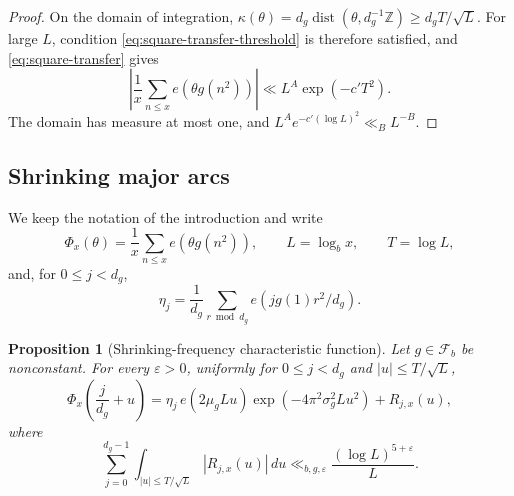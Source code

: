 \documentclass[11pt,reqno]{amsart}
\theoremstyle{plain}
\newtheorem{proposition}[theorem]{Proposition}
\theoremstyle{definition}
\newcommand{\Z}{\mathbb{Z}}
\newcommand{\eps}{\varepsilon}
\newcommand{\ee}[1]{e\!\left(#1\right)}
\newcommand{\1}{\mathbf 1}
\DeclareMathOperator{\dist}{dist}
\begin{document}
\begin{proof}
On the domain of integration,
$\kappa(\theta)=d_g\dist(\theta,d_g^{-1}\Z)\ge d_gT/\sqrt L$.
For large $L$, condition \eqref{eq:square-transfer-threshold} is therefore satisfied, and \eqref{eq:square-transfer} gives
\[
 \left|\frac1x\sum_{n\le x}\ee{\theta g(n^2)}\right|
 \ll L^A\exp(-c'T^2).
\]
The domain has measure at most one, and $L^Ae^{-c'(\log L)^2}\ll_B L^{-B}$.
\end{proof}

\subsection{Shrinking major arcs}

We keep the notation of the introduction and write
\begin{equation}\label{eq:square-Phi}
 \Phi_x(\theta)=\frac1x\sum_{n\le x}\ee{\theta g(n^2)},
 \qquad L=\log_bx,\qquad T=\log L,
\end{equation}
and, for $0\le j<d_g$,
\begin{equation}\label{eq:square-eta}
 \eta_j=\frac1{d_g}\sum_{r\bmod d_g}
 \ee{jg(1)r^2/d_g}.
\end{equation}

\begin{proposition}[Shrinking-frequency characteristic function]\label{prop:square-major}
Let $g\in\mathcal F_b$ be nonconstant.  For every $\eps>0$, uniformly for $0\le j<d_g$ and $|u|\le T/\sqrt L$,
\begin{equation}\label{eq:square-major-point}
 \Phi_x\left(\frac j{d_g}+u\right)
 =\eta_j\,\ee{2\mu_gLu}
 \exp(-4\pi^2\sigma_g^2Lu^2)+R_{j,x}(u),
\end{equation}
where
\begin{equation}\label{eq:square-major-L1}
 \sum_{j=0}^{d_g-1}\int_{|u|\le T/\sqrt L}|R_{j,x}(u)|\,du
 \ll_{b,g,\eps}\frac{(\log L)^{5+\eps}}{L}.
\end{equation}
\end{proposition}
\end{document}
